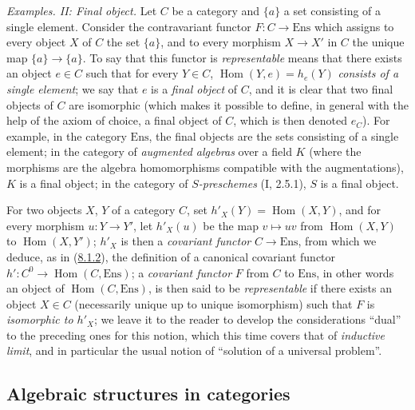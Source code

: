 \begin{env}[8.1.10]
\label{0.8.1.10}
\textit{Examples. II: Final object.} Let $C$ be a category and $\{a\}$ a
set consisting of a single element. Consider the contravariant functor
$F:C\to\mathrm{Ens}$ which assigns to every object $X$ of $C$
the set $\{a\}$, and to every morphism $X\to X'$ in $C$ the unique
map $\{a\}\to\{a\}$. To say that this functor is \emph{representable}
means that there exists an object $e\in C$ such that for every $Y\in C$,
$\operatorname{Hom}(Y,e)=h_e(Y)$ \emph{consists of a single element}; we say
that $e$ is a \emph{final object} of $C$, and it is clear that two final
objects of $C$ are isomorphic (which makes it possible to define, in general
with the help of the axiom of choice, a final object of $C$, which is then
denoted $e_C$). For example, in the category $\mathrm{Ens}$, the final objects
are the sets consisting of a single element; in the category of
\emph{augmented algebras} over a field $K$ (where the morphisms are the
algebra homomorphisms compatible with the augmentations), $K$ is a final
object; in the category of \emph{$S$-preschemes} (I, 2.5.1), $S$ is a final
object.
\end{env}

\begin{env}[8.1.11]
\label{0.8.1.11}
For two objects $X$, $Y$ of a category $C$, set
$h'_X(Y)=\operatorname{Hom}(X,Y)$, and for every morphism $u:Y\to Y'$, let
$h'_X(u)$ be the map $v\mapsto uv$ from $\operatorname{Hom}(X,Y)$ to
$\operatorname{Hom}(X,Y')$; $h'_X$ is then a \emph{covariant functor}
$C\to\mathrm{Ens}$, from which we deduce, as in
(\hyperref[0.8.1.2]{8.1.2}), the definition of a canonical covariant
functor $h':C^0\to\operatorname{Hom}(C,\mathrm{Ens})$; a \emph{covariant
functor} $F$ from $C$ to $\mathrm{Ens}$, in other words an object of
$\operatorname{Hom}(C,\mathrm{Ens})$, is then said to be \emph{representable}
if there exists an object $X\in C$ (necessarily unique up to unique
isomorphism) such that $F$ is \emph{isomorphic to $h'_X$}; we leave it to the
reader to develop the considerations ``dual'' to the preceding ones for
this notion, which this time covers that of \emph{inductive limit}, and in
particular the usual notion of ``solution of a universal problem''.
\end{env}

\subsection{Algebraic structures in categories}
\label{subsection:0.8.2}

